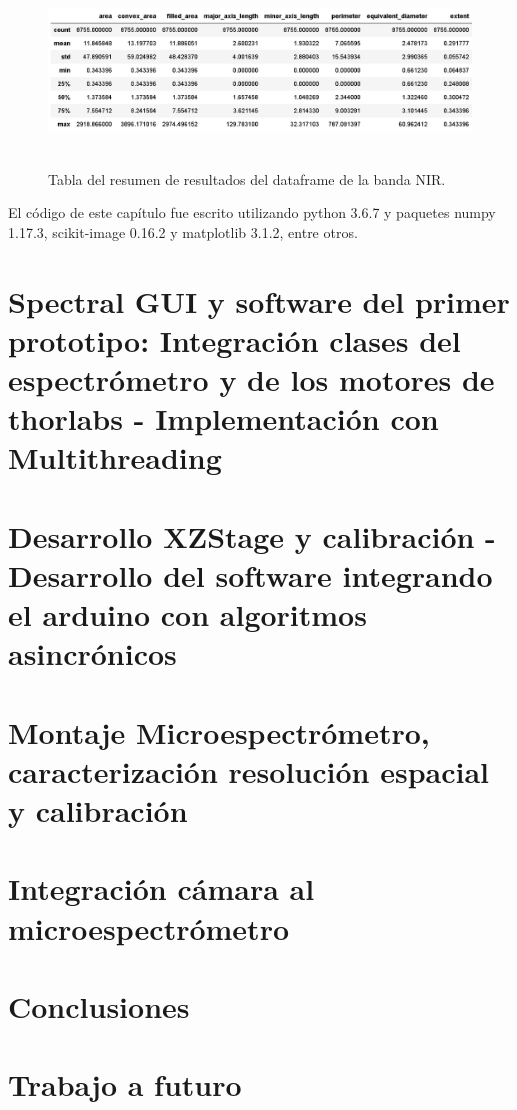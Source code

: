 \documentclass{ctuthesis}
\begin{document}
\begin{figure}[H]
	\centering
	\includegraphics[width=1.0\textwidth,height= 5.0cm]{Figs/resultados_defectos/tabla_nir.png}
	\caption{Tabla del resumen de resultados del dataframe de la banda NIR.}
	\label{fig:bgcel}
\end{figure}





El código de este capítulo fue escrito utilizando python 3.6.7 y paquetes numpy 1.17.3, scikit-image 0.16.2 y matplotlib 3.1.2, entre otros.





\vspace{1cm}
\vspace{1cm}

\chapter{Spectral GUI y software del primer prototipo: Integración clases del espectrómetro y de los motores de thorlabs - Implementación con Multithreading}

\chapter{Desarrollo XZStage y calibración - Desarrollo del software integrando el arduino con algoritmos asincrónicos}

\chapter{Montaje Microespectrómetro, caracterización resolución espacial y calibración}{}

\chapter{Integración cámara al microespectrómetro}



\chapter{Conclusiones}

\chapter{Trabajo a futuro}

\renewcommand\bibname{Referencias Bibliográficas}


\end{document}
